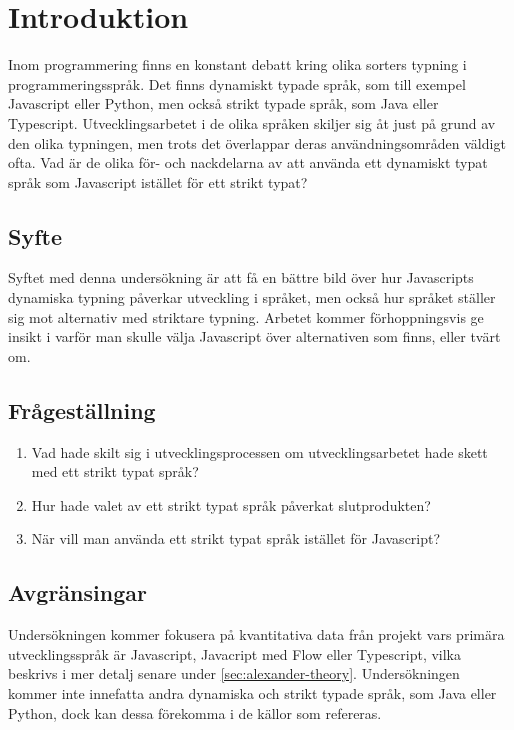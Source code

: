 \section{Introduktion}
\label{sec:alexander-introduction}
Inom programmering finns en konstant debatt kring olika sorters typning i programmeringsspråk. Det finns dynamiskt typade språk, som till exempel Javascript eller Python, men också strikt typade språk, som Java eller Typescript. Utvecklingsarbetet i de olika språken skiljer sig åt just på grund av den olika typningen, men trots det överlappar deras användningsområden väldigt ofta. Vad är de olika för- och nackdelarna av att använda ett dynamiskt typat språk som Javascript istället för ett strikt typat?

\subsection{Syfte}
\label{subsec:motivation}

Syftet med denna undersökning är att få en bättre bild över hur Javascripts dynamiska typning påverkar utveckling i språket, men också hur språket ställer sig mot alternativ med striktare typning. Arbetet kommer förhoppningsvis ge insikt i varför man skulle välja Javascript över alternativen som finns, eller tvärt om.

\subsection{Frågeställning}
\label{subsec:research-questions}

\begin{enumerate}
\item Vad hade skilt sig i utvecklingsprocessen om utvecklingsarbetet hade skett med ett strikt typat språk?

\item Hur hade valet av ett strikt typat språk påverkat slutprodukten?

\item När vill man använda ett strikt typat språk istället för Javascript?

\end{enumerate}


\subsection{Avgränsingar}
\label{subsec:delimitations}

Undersökningen kommer fokusera på kvantitativa data från projekt vars primära utvecklingsspråk är Javascript, Javacript med Flow eller Typescript, vilka beskrivs i mer detalj senare under \ref{sec:alexander-theory}. Undersökningen kommer inte innefatta andra dynamiska och strikt typade språk, som Java eller Python, dock kan dessa förekomma i de källor som refereras.




